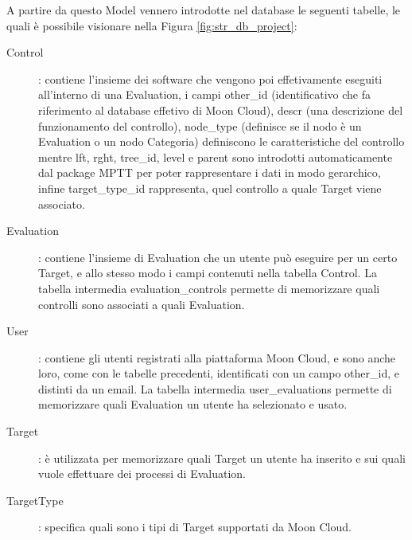 A partire da questo Model vennero introdotte nel database le seguenti tabelle, le quali è possibile visionare nella Figura 
\ref{fig:str_db_project}:
\begin{description}
	\item[Control]: contiene l'insieme dei software che vengono poi effetivamente eseguiti all'interno di una Evaluation, 
	i campi other\_id (identificativo che fa riferimento al database effetivo di Moon Cloud),
	descr (una descrizione del funzionamento del controllo), node\_type (definisce se il nodo è un Evaluation o un nodo Categoria)
	definiscono le caratteristiche del controllo mentre lft, rght, tree\_id, level e parent sono introdotti 
	automaticamente dal package MPTT per poter rappresentare i dati in modo gerarchico, infine target\_type\_id rappresenta, quel
	controllo a quale Target viene associato. 
	\item[Evaluation]: contiene l'insieme di Evaluation che un utente può eseguire per un certo Target, e allo stesso modo 
	i campi contenuti nella tabella Control. La tabella intermedia evaluation\_controls permette di memorizzare quali controlli
	sono associati a quali Evaluation.
	\item[User]: contiene gli utenti registrati alla piattaforma Moon Cloud, e sono anche loro, come con le tabelle precedenti,
	identificati con un campo other\_id, e distinti da un email. La tabella intermedia user\_evaluations permette di memorizzare 
	quali Evaluation un utente ha selezionato e usato.
	\item[Target]: è utilizzata per memorizzare quali Target un utente ha inserito e sui quali vuole effettuare dei processi
	di Evaluation.  
	\item[TargetType]: specifica quali sono i tipi di Target supportati da Moon Cloud.
\end{description}

